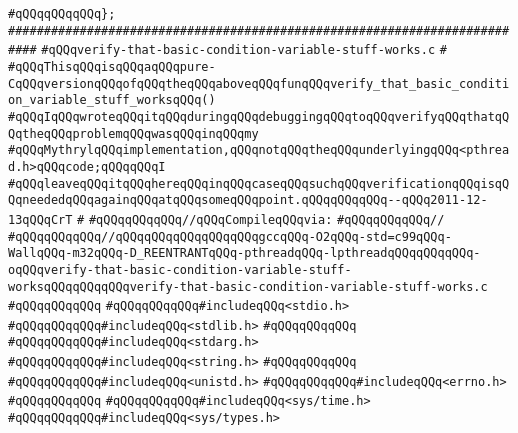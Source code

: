 \verb|#qQQqqQQqqQQq};|\newline
\newline
\verb|##########################################################################|\newline
\verb|#qQQqverify-that-basic-condition-variable-stuff-works.c|\newline
\verb|#|\newline
\verb|#qQQqThisqQQqisqQQqaqQQqpure-CqQQqversionqQQqofqQQqtheqQQqaboveqQQqfunqQQqverify_that_basic_condition_variable_stuff_worksqQQq()|\newline
\verb|#qQQqIqQQqwroteqQQqitqQQqduringqQQqdebuggingqQQqtoqQQqverifyqQQqthatqQQqtheqQQqproblemqQQqwasqQQqinqQQqmy|\newline
\verb|#qQQqMythrylqQQqimplementation,qQQqnotqQQqtheqQQqunderlyingqQQq<pthread.h>qQQqcode;qQQqqQQqI|\newline
\verb|#qQQqleaveqQQqitqQQqhereqQQqinqQQqcaseqQQqsuchqQQqverificationqQQqisqQQqneededqQQqagainqQQqatqQQqsomeqQQqpoint.qQQqqQQqqQQq--qQQq2011-12-13qQQqCrT|\newline
\verb|#|\newline
\verb|#qQQqqQQqqQQq//qQQqCompileqQQqvia:|\newline
\verb|#qQQqqQQqqQQq//|\newline
\verb|#qQQqqQQqqQQq//qQQqqQQqqQQqqQQqqQQqgccqQQq-O2qQQq-std=c99qQQq-WallqQQq-m32qQQq-D_REENTRANTqQQq-pthreadqQQq-lpthreadqQQqqQQqqQQq-oqQQqverify-that-basic-condition-variable-stuff-worksqQQqqQQqqQQqverify-that-basic-condition-variable-stuff-works.c|\newline
\verb|#qQQqqQQqqQQq|\newline
\verb|#qQQqqQQqqQQq#includeqQQq<stdio.h>|\newline
\verb|#qQQqqQQqqQQq#includeqQQq<stdlib.h>|\newline
\verb|#qQQqqQQqqQQq|\newline
\verb|#qQQqqQQqqQQq#includeqQQq<stdarg.h>|\newline
\verb|#qQQqqQQqqQQq#includeqQQq<string.h>|\newline
\verb|#qQQqqQQqqQQq|\newline
\verb|#qQQqqQQqqQQq#includeqQQq<unistd.h>|\newline
\verb|#qQQqqQQqqQQq#includeqQQq<errno.h>|\newline
\verb|#qQQqqQQqqQQq|\newline
\verb|#qQQqqQQqqQQq#includeqQQq<sys/time.h>|\newline
\verb|#qQQqqQQqqQQq#includeqQQq<sys/types.h>|\newline
